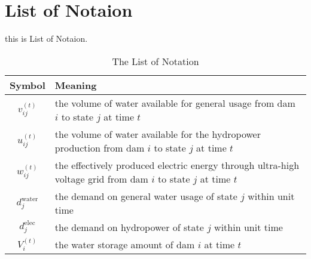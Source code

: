 \section{List of Notaion} %

this is List of Notaion.

\begin{table}[h]
\centering
\begin{tabular}{@{}cl@{}}
\toprule
Symbol & Meaning \\
\midrule
$v_{ij}^{(t)}$ & the volume of water available for general usage from dam $i$ to state $j$ at time $t$ \\
$u_{ij}^{(t)}$ & the volume of water available for the hydropower production from dam $i$ to state $j$ at time $t$ \\
$w_{ij}^{(t)}$ & the effectively produced electric energy through ultra-high voltage grid from dam $i$ to state $j$ at time $t$ \\
$d_{j}^{\text{water}}$ & the demand on general water usage of state $j$ within unit time \\
$d_{j}^{\text{elec}}$ & the demand on hydropower of state $j$ within unit time \\
$V_{i}^{(t)}$ & the water storage amount of dam $i$ at time $t$ \\
\bottomrule
\end{tabular}
\caption{The List of Notation}
\label{tab:notation}
\end{table}
